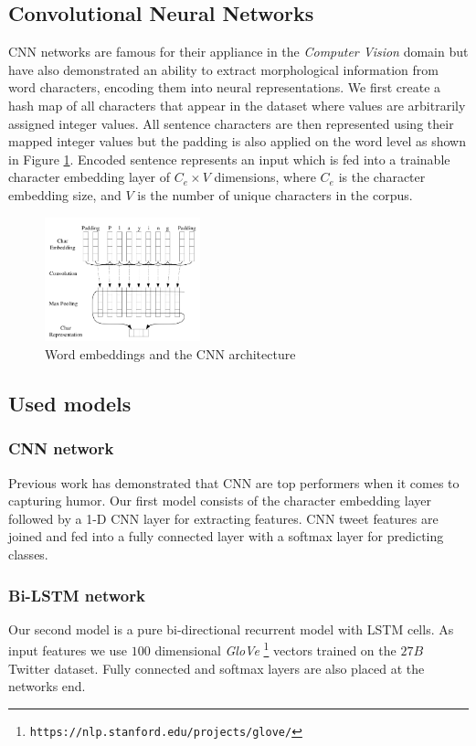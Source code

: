 \documentclass[10pt, a4paper]{article}
\begin{document}
\subsection{Convolutional Neural Networks}
CNN networks are famous for their appliance in the \emph{Computer Vision}
domain but have also demonstrated an ability to extract morphological information
from word characters, encoding them into neural representations. We first create
a hash map of all characters that appear in the dataset where values are arbitrarily
assigned integer values. All sentence characters are then represented using their
mapped integer values but the padding is also applied on the word level as shown
in Figure \ref{fig:cnn_embed}. Encoded sentence represents an input which is fed
into a trainable character embedding layer of $C_e \times V$ dimensions, where
$C_e$ is the character embedding size, and $V$ is the number of unique
characters in the corpus.

\begin{figure}
  \caption{Word embeddings and the CNN architecture}
  \label{fig:cnn_embed}
  \centering
    \includegraphics[width=0.4\textwidth]{imgs/cnn_embed.png}
\end{figure}

\subsection{Used models}

\subsubsection{CNN network}
Previous work \citep{potash2016hashtagwars} has demonstrated that CNN are top performers
when it comes to capturing humor. Our first model consists of the character
embedding layer followed by a 1-D CNN layer for extracting features. CNN tweet
features are joined and fed into a fully connected layer with a softmax layer
for predicting classes. 

\subsubsection{Bi-LSTM network}
Our second model is a pure bi-directional recurrent model with LSTM cells. As
input features we use $100$ dimensional \emph{GloVe} \footnote{\texttt{https://nlp.stanford.edu/projects/glove/}} \citep{glove2014} vectors trained on the $27B$
Twitter dataset. Fully connected and softmax layers are also placed at the
networks end.
\end{document}
